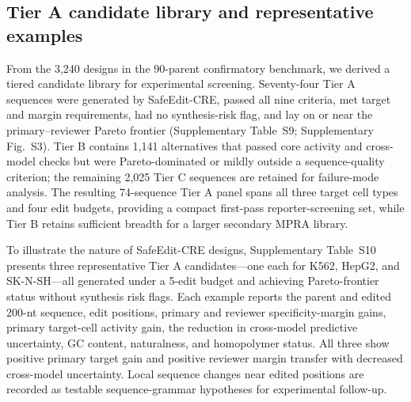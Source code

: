 \subsection{Tier A candidate library and representative examples}

From the 3,240 designs in the 90-parent confirmatory benchmark, we derived a tiered candidate
library for experimental screening. Seventy-four Tier A sequences were generated by
SafeEdit-CRE, passed all nine criteria, met target and margin requirements, had no
synthesis-risk flag, and lay on or near the primary--reviewer Pareto frontier
(Supplementary Table~S9; Supplementary Fig.~S3). Tier B contains 1,141 alternatives
that passed core activity and cross-model checks but were Pareto-dominated or mildly
outside a sequence-quality criterion; the remaining 2,025 Tier C sequences are
retained for failure-mode analysis. The resulting 74-sequence Tier A panel spans all
three target cell types and four edit budgets, providing a compact first-pass
reporter-screening set, while Tier B retains sufficient breadth for a larger secondary
MPRA library.

To illustrate the nature of SafeEdit-CRE designs, Supplementary Table~S10 presents
three representative Tier A candidates---one each for K562, HepG2, and SK-N-SH---all
generated under a 5-edit budget and achieving Pareto-frontier status without synthesis
risk flags. Each example reports the parent and edited 200-nt sequence, edit positions,
primary and reviewer specificity-margin gains, primary target-cell activity gain, the
reduction in cross-model predictive uncertainty, GC content, naturalness, and
homopolymer status. All three show positive primary target gain and positive reviewer
margin transfer with decreased cross-model uncertainty. Local sequence changes near
edited positions are recorded as testable sequence-grammar hypotheses for experimental
follow-up.
